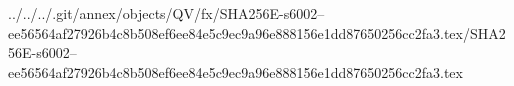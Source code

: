 ../../../.git/annex/objects/QV/fx/SHA256E-s6002--ee56564af27926b4c8b508ef6ee84e5c9ec9a96e888156e1dd87650256cc2fa3.tex/SHA256E-s6002--ee56564af27926b4c8b508ef6ee84e5c9ec9a96e888156e1dd87650256cc2fa3.tex